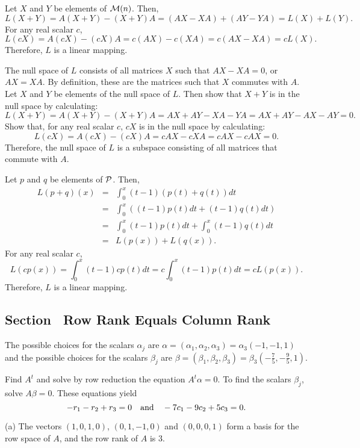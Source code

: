 \documentclass{ximera}
\begin{document}
Let $X$ and $Y$ be elements of ${\cal M}(n)$.  Then,
\[ L(X + Y) = A(X + Y) - (X + Y)A = (AX - XA)
+ (AY - YA) = L(X) + L(Y). \]
For any real scalar $c$,
\[ L(cX) = A(cX) - (cX)A = c(AX) - c(XA) = c(AX - XA) = cL(X). \]
Therefore, $L$ is a linear mapping.

\para The null space of $L$ consists of all matrices $X$ such that
$AX - XA = 0$, or $AX = XA$.  By definition, these are the matrices
such that $X$ commutes with $A$.  Let $X$ and $Y$ be elements of
the null space of $L$.  Then show that $X + Y$ is in the null space
by calculating:
\[ L(X + Y) = A(X + Y) - (X + Y)A = AX + AY - XA - YA = AX + AY - AX
- AY = 0. \]
Show that, for any real scalar $c$, $cX$ is in the null space by
calculating:
\[ L(cX) = A(cX) - (cX)A = cAX - cXA = cAX - cAX = 0. \]
Therefore, the null space of $L$ is a subspace consisting of all
matrices that commute with $A$.

Let $p$ and $q$ be elements of ${\cal P}$.  Then,
\[ \begin{array}{rcl}
L(p + q)(x) & = & \int_0^x(t - 1)(p(t) + q(t))dt \\
& = & \int_0^x((t - 1)p(t)dt + (t - 1)q(t)dt) \\
& = & \int_0^x(t - 1)p(t)dt + \int_0^x(t - 1)q(t)dt \\
& = & L(p(x)) + L(q(x)). \end{array} \]
For any real scalar $c$,
\[ L(cp(x)) = \int_0^x(t - 1)cp(t)dt = c\int_0^x(t - 1)p(t)dt
= cL(p(x)). \]
Therefore, $L$ is a linear mapping.



\newpage
\subsection*{Section~\protect{\ref{S:5.8}} Row Rank Equals Column Rank}

\ans The possible choices for the scalars $\alpha_j$ are
$\alpha = (\alpha_1,\alpha_2,\alpha_3) = \alpha_3(-1,-1,1)$ and
the possible choices for the scalars $\beta_j$ are $\beta = 
(\beta_1,\beta_2,\beta_3) = \beta_3(-\frac{7}{5},-\frac{9}{5},1)$.

\soln Find $A^t$ and solve by row reduction the equation
$A^t\alpha = 0$.  To find the scalars $\beta_j$, solve $A\beta =
0$.  These equations yield
\[
-r_1 - r_2 + r_3 = 0 \quad\mbox{and}\quad -7c_1 - 9c_2 + 5c_3 = 0.
\]

(a) \ans The vectors $(1,0,1,0)$, $(0,1,-1,0)$ and $(0,0,0,1)$ form a
basis for the row space of $A$, and the row rank of $A$ is $3$.
\end{document}
